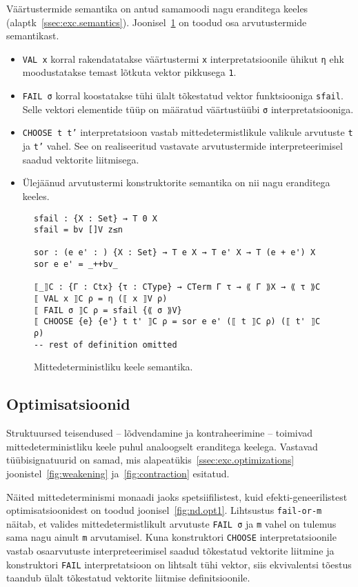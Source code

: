 \documentclass[a4paper,12pt]{article}
\begin{document}
Väärtustermide semantika on antud samamoodi nagu eranditega keeles (alaptk~\ref{ssec:exc.semantics}).
Joonisel~\ref{fig:nd.semantics} on toodud osa arvutustermide semantikast.
\begin{itemize}
\item {\tt VAL x} korral rakendatatakse väärtustermi {\tt x} interpretatsioonile ühikut {\tt η} ehk moodustatakse temast lõtkuta vektor pikkusega {\tt 1}.
\item {\tt FAIL σ} korral koostatakse tühi ülalt tõkestatud vektor funktsiooniga {\tt sfail}. Selle vektori elementide tüüp on määratud väärtustüübi {\tt σ} interpretatsiooniga.
\item {\tt CHOOSE t t'} interpretatsioon vastab mittedetermistlikule valikule arvutuste {\tt t} ja {\tt t'} vahel. See on realiseeritud vastavate arvutustermide interpreteerimisel saadud vektorite liitmisega.
\item Ülejäänud arvutustermi konstruktorite semantika on nii nagu eranditega keeles.
\end{itemize}
\begin{figure}
  \begin{BVerbatim}
sfail : {X : Set} → T 0 X
sfail = bv []V z≤n

sor : (e e' : ) {X : Set} → T e X → T e' X → T (e + e') X
sor e e' = _++bv_

⟦_⟧C : {Γ : Ctx} {τ : CType} → CTerm Γ τ → ⟪ Γ ⟫X → ⟪ τ ⟫C
⟦ VAL x ⟧C ρ = η (⟦ x ⟧V ρ)
⟦ FAIL σ ⟧C ρ = sfail {⟪ σ ⟫V}
⟦ CHOOSE {e} {e'} t t' ⟧C ρ = sor e e' (⟦ t ⟧C ρ) (⟦ t' ⟧C ρ)
-- rest of definition omitted
  \end{BVerbatim}
  \caption{Mittedeterministliku keele semantika.}
  \label{fig:nd.semantics}
\end{figure}

\subsection{Optimisatsioonid}

Struktuursed teisendused -- lõdvendamine ja kontraheerimine -- toimivad mittedeterministliku keele puhul analoogselt eranditega keelega. Vastavad tüübisignatuurid on samad, mis alapeatükis~\ref{ssec:exc.optimizations} joonistel~\ref{fig:weakening} ja~\ref{fig:contraction} esitatud.

Näited mittedeterminismi monaadi jaoks spetsiifilistest, kuid efekti-geneerilistest optimisatsioonidest on toodud joonisel~\ref{fig:nd.opt1}.
Lihtsustus {\tt fail-or-m} näitab, et valides mittedetermistlikult arvutuste {\tt FAIL σ} ja {\tt m} vahel on tulemus sama nagu ainult {\tt m} arvutamisel. Kuna konstruktori {\tt CHOOSE} interpretatsioonile vastab osaarvutuste interpreteerimisel saadud tõkestatud vektorite liitmine ja konstruktori {\tt FAIL} interpretatsioon on lihtsalt tühi vektor, siis ekvivalentsi tõestus taandub ülalt tõkestatud vektorite liitmise definitsioonile.
\end{document}
